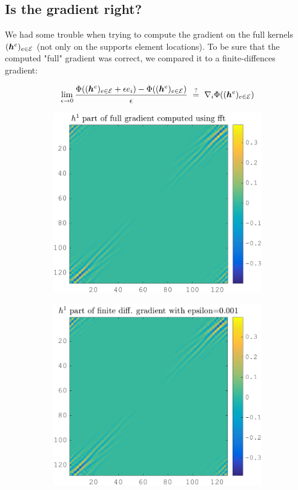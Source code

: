 \subsection{Is the gradient right?}
We had some trouble when trying to compute the gradient on the full kernels $(\bm{h}^e)_{e \in \mathcal E}$ (not only on the supports element locations). To be sure that the computed "full" gradient was correct, we compared it to a finite-diffences gradient:

$$\lim_{\epsilon \rightarrow 0} \frac{\Phi((\bm{h}^e)_{e \in \mathcal E}+\epsilon e_i) - \Phi ((\bm{h}^e)_{e \in \mathcal E}) }{\epsilon} ~\overset{?}{=}~ \nabla_i \Phi ((\bm{h}^e)_{e \in \mathcal E})$$

\begin{figure}[!ht]\centering
\begin{subfigure}[b]{0.30\textwidth}\centering
\includegraphics[width=\textwidth]{figures/verif_gradient/gradient.png}
\end{subfigure}
\begin{subfigure}[b]{0.30\textwidth}\centering
\includegraphics[width=\textwidth]{figures/verif_gradient/finite-diff.png}

\end{subfigure}
\end{figure}
